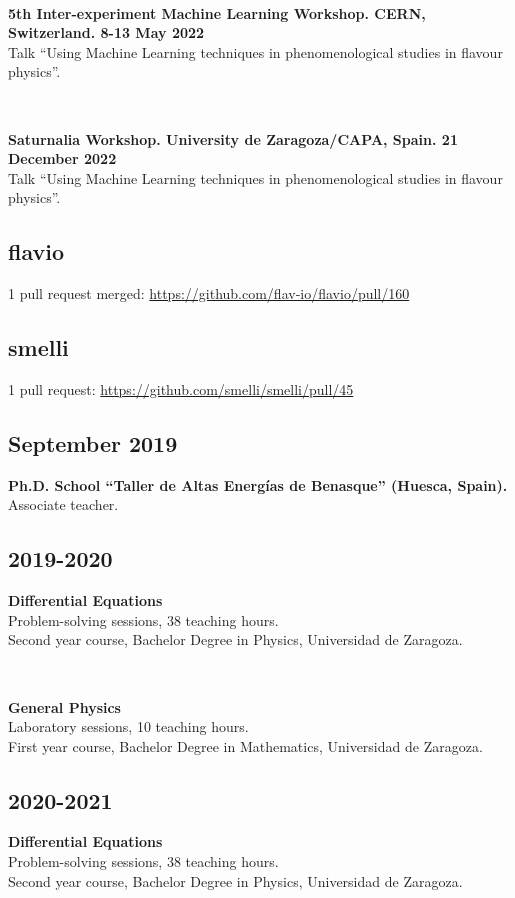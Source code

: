 \documentclass[combined.tex]{subfiles}
\begin{document}
~

\textbf{5th Inter-experiment Machine Learning Workshop. CERN, Switzerland. 8-13 May 2022}\\
Talk ``Using Machine Learning techniques in phenomenological studies in flavour physics''.

~

\textbf{Saturnalia Workshop. University de Zaragoza/CAPA, Spain. 21 December 2022}\\
Talk ``Using Machine Learning techniques in phenomenological studies in flavour physics''.


\subsection{flavio}
1 pull request merged: \url{https://github.com/flav-io/flavio/pull/160}

\subsection{smelli}
1 pull request: \url{https://github.com/smelli/smelli/pull/45}


\subsection{September 2019}
\hspace{\parindent}\textbf{Ph.D. School ``Taller de Altas Energías de Benasque'' (Huesca, Spain).}\\
Associate teacher.

\subsection{2019-2020}
\hspace{\parindent}\textbf{Differential Equations}\\
Problem-solving sessions, 38 teaching hours.\\
Second year course, Bachelor Degree in Physics, Universidad de Zaragoza.

~

\textbf{General Physics}\\
Laboratory sessions, 10 teaching hours.\\
First year course, Bachelor Degree in Mathematics, Universidad de Zaragoza.

\subsection{2020-2021}
\hspace{\parindent}\textbf{Differential Equations}\\
Problem-solving sessions, 38 teaching hours.\\
Second year course, Bachelor Degree in Physics, Universidad de Zaragoza.
\end{document}
